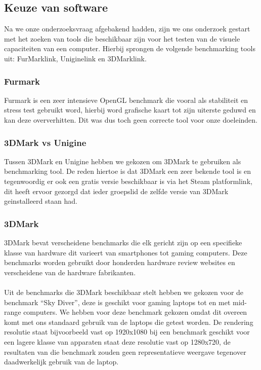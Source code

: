 \subsection{Keuze van software}
Na we onze onderzoeksvraag afgebakend hadden, zijn we ons onderzoek gestart met het zoeken van tools die beschikbaar zijn voor het testen van de visuele capaciteiten van een computer. Hierbij sprongen de volgende benchmarking tools uit: FurMark{link}, Unigine{link} en 3DMark{link}.

\subsubsection{Furmark}
Furmark is een zeer intensieve OpenGL benchmark die vooral als stabiliteit en stress test gebruikt word, hierbij word grafische kaart tot zijn uiterste geduwd en kan deze oververhitten. Dit was dus toch geen correcte tool voor onze doeleinden. \citep{furmark}

\subsubsection{3DMark vs Unigine}
Tussen 3DMark en Unigine hebben we gekozen om 3DMark te gebruiken als benchmarking tool. De reden hiertoe is dat 3DMark een zeer bekende tool is en tegenwoordig er ook een gratis versie beschikbaar is via het Steam platform{link}, dit heeft ervoor gezorgd dat ieder groepslid de zelfde versie van 3DMark geinstalleerd staan had.

\subsubsection{3DMark}
3DMark bevat verscheidene benchmarks die elk gericht zijn op een specifieke klasse van hardware dit varieert van smartphones tot gaming computers. Deze benchmarks worden gebruikt door honderden hardware review websites en verscheidene van de hardware fabrikanten.\\\\
Uit de benchmarks die 3DMark beschikbaar stelt hebben we gekozen voor de benchmark “Sky Diver”, deze is geschikt voor gaming laptops tot en met mid-range computers. We hebben voor deze benchmark gekozen omdat dit overeen komt met ons standaard gebruik van de laptops die getest worden. De rendering resolutie staat bijvoorbeeld vast op 1920x1080 bij een benchmark geschikt voor een lagere klasse van apparaten staat deze resolutie vast op 1280x720, de resultaten van die benchmark zouden geen representatieve weergave tegenover daadwerkelijk gebruik van de laptop.

